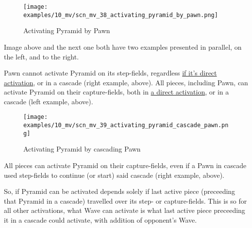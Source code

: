 \vspace*{-1.4\baselineskip}
\noindent
\begin{figure}[!h]
\texttt{[image: examples/10\_mv/scn\_mv\_38\_activating\_pyramid\_by\_pawn.png]}
\vspace*{-1.3\baselineskip}
\caption{Activating Pyramid by Pawn}
\label{fig:scn_mv_38_activating_pyramid_by_pawn}
\end{figure}

\vspace*{-0.3\baselineskip}
Image above and the next one both have two examples presented in parallel, on the left,
and to the right.

Pawn cannot activate Pyramid on its step-fields, regardless
\hyperref[fig:scn_ma_04_pyramid_activation_by_pawn]{if it's direct activation}, or in a cascade
(right example, above). All pieces, including Pawn, can activate Pyramid on their capture-fields,
both in \hyperref[fig:scn_ma_01_pyramid_activation_init]{a direct activation}, or in a cascade
(left example, above).

\clearpage %

\vspace*{-2.1\baselineskip}
\noindent
\begin{figure}[!h]
\texttt{[image: examples/10\_mv/scn\_mv\_39\_activating\_pyramid\_cascade\_pawn.png]}
\vspace*{-1.3\baselineskip}
\caption{Activating Pyramid by cascading Pawn}
\label{fig:scn_mv_39_activating_pyramid_cascade_pawn}
\end{figure}

\vspace*{-0.3\baselineskip}
All pieces can activate Pyramid on their capture-fields, even if a Pawn in cascade used
step-fields to continue (or start) said cascade (right example, above).

So, if Pyramid can be activated depends solely if last active piece (preceeding that Pyramid
in a cascade) travelled over its step- or capture-fields. This is so for all other activations,
what Wave can activate is what last active piece preceeding it in a cascade could activate,
with addition of opponent's Wave.

\clearpage %

